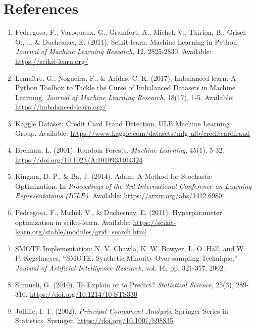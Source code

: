 \documentclass[journal]{IEEEtran}
\begin{document}
\section{References}
\begin{enumerate}
    \item Pedregosa, F., Varoquaux, G., Gramfort, A., Michel, V., Thirion, B., Grisel, O., ... \& Duchesnay, E. (2011). Scikit-learn: Machine Learning in Python. \textit{Journal of Machine Learning Research}, 12, 2825-2830. Available: \url{https://scikit-learn.org/}
    \item Lemaître, G., Nogueira, F., \& Aridas, C. K. (2017). Imbalanced-learn: A Python Toolbox to Tackle the Curse of Imbalanced Datasets in Machine Learning. \textit{Journal of Machine Learning Research}, 18(17), 1-5. Available: \url{https://imbalanced-learn.org/}
    \item Kaggle Dataset: Credit Card Fraud Detection. ULB Machine Learning Group. Available: \url{https://www.kaggle.com/datasets/mlg-ulb/creditcardfraud}
    \item Breiman, L. (2001). Random Forests. \textit{Machine Learning}, 45(1), 5-32. \url{https://doi.org/10.1023/A:1010933404324}
    \item Kingma, D. P., \& Ba, J. (2014). Adam: A Method for Stochastic Optimization. In \textit{Proceedings of the 3rd International Conference on Learning Representations (ICLR)}. Available: \url{https://arxiv.org/abs/1412.6980}
    \item Pedregosa, F., Michel, V., \& Duchesnay, E. (2011). Hyperparameter optimization in scikit-learn. Available: \url{https://scikit-learn.org/stable/modules/grid_search.html}
    \item SMOTE Implementation: N. V. Chawla, K. W. Bowyer, L. O. Hall, and W. P. Kegelmeyer, ``SMOTE: Synthetic Minority Over-sampling Technique,'' \textit{Journal of Artificial Intelligence Research}, vol. 16, pp. 321-357, 2002.
    \item Shmueli, G. (2010). To Explain or to Predict? \textit{Statistical Science}, 25(3), 289-310. \url{https://doi.org/10.1214/10-STS330}
    \item Jolliffe, I. T. (2002). \textit{Principal Component Analysis}. Springer Series in Statistics. Springer. \url{https://doi.org/10.1007/b98835}
\end{enumerate}
\end{document}
